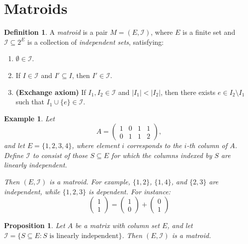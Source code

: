 \documentclass[11pt]{article}
\theoremstyle{plain}
\newtheorem{proposition}[theorem]{Proposition}
\newtheorem{example}[theorem]{Example}
\theoremstyle{definition}
\newtheorem{definition}[theorem]{Definition}
\begin{document}
\section{Matroids}
 
\begin{definition}
A \emph{matroid} is a pair $M = (E, \mathcal{I})$, where $E$ is a finite set
and $\mathcal{I} \subseteq 2^{E}$ is a collection of \emph{independent sets},
satisfying:
\begin{enumerate}[label=(\roman*), itemsep=0.4ex]
  \item $\emptyset \in \mathcal{I}$.
  \item If $I \in \mathcal{I}$ and $I' \subseteq I$, then $I' \in \mathcal{I}$.
  \item \textbf{(Exchange axiom)} If $I_1, I_2 \in \mathcal{I}$ and $|I_1| < |I_2|$,
        then there exists $e \in I_2 \setminus I_1$ such that
        $I_1 \cup \{e\} \in \mathcal{I}$.
\end{enumerate}
\end{definition}
 
\begin{example}
Let
\[
  A = \begin{pmatrix} 1 & 0 & 1 & 1 \\ 0 & 1 & 1 & 2 \end{pmatrix},
\]
and let $E = \{1,2,3,4\}$, where element $i$ corresponds to the $i$-th column
of $A$. Define $\mathcal{I}$ to consist of those $S \subseteq E$ for which the
columns indexed by $S$ are linearly independent.
 
Then $(E, \mathcal{I})$ is a matroid. For example, $\{1,2\}$, $\{1,4\}$, and
$\{2,3\}$ are independent, while $\{1,2,3\}$ is dependent. For instance:
\[
\begin{pmatrix}1\\1\end{pmatrix} = \begin{pmatrix}1\\0\end{pmatrix} + \begin{pmatrix}0\\1\end{pmatrix}
\]
\end{example}
 
\begin{proposition}
Let $A$ be a matrix with column set $E$, and let
$\mathcal{I} = \{S \subseteq E : S \text{ is linearly independent}\}$.
Then $(E, \mathcal{I})$ is a matroid.
\end{proposition}
 
\end{document}

